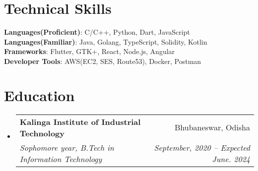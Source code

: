\documentclass[letterpaper,11pt]{article}
\makeatletter
\newcommand{\resumeItem}[1]{
  \item\small{
    {#1 \vspace{-2pt}}
  }
}
\newcommand{\resumeSubheading}[4]{
  \vspace{-2pt}\item
    \begin{tabular*}{0.97\textwidth}[t]{l@{\extracolsep{\fill}}r}
      \textbf{#1} & #2 \\
      \textit{\small#3} & \textit{\small #4} \\
    \end{tabular*}\vspace{-7pt}
}
\newcommand{\resumeSubHeadingListStart}{\begin{itemize}[leftmargin=0.15in, label={}]}
\newcommand{\resumeSubHeadingListEnd}{\end{itemize}}
\newcommand{\resumeItemListStart}{\begin{itemize}}
\newcommand{\resumeItemListEnd}{\end{itemize}\vspace{-5pt}}
\makeatother
\begin{document}
%
\section{Technical Skills}
 \begin{itemize}[leftmargin=0.15in, label={}]
    \small{\item{
     \textbf{Languages(Proficient)}{: C/C++, Python, Dart, JavaScript } \\
      \textbf{Languages(Familiar)}{: Java, Golang, TypeScript, Solidity, Kotlin } \\
     \textbf{Frameworks}{: Flutter, GTK+, React, Node.js, Angular } \\
     \textbf{Developer Tools}{: AWS(EC2, SES, Route53), Docker, Postman } \\
    }}
 \end{itemize}

 
\section{Education}
  \resumeSubHeadingListStart
    \resumeSubheading
      {Kalinga Institute of Industrial Technology}{Bhubaneswar, Odisha}
      {Sophomore year, B.Tech in Information Technology}{September, 2020 -- Expected June. 2024}
  \resumeSubHeadingListEnd
\end{document}
